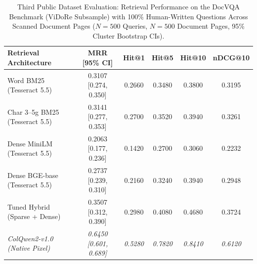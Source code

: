 \begin{table}[t]
\centering
\small
\caption{Third Public Dataset Evaluation: Retrieval Performance on the DocVQA Benchmark (ViDoRe Subsample) with 100\% Human-Written Questions Across Scanned Document Pages ($N=500$ Queries, $N=500$ Document Pages, 95\% Cluster Bootstrap CIs).}
\label{tab:docvqa_benchmark_v9}
\begin{tabular}{lccccc}
\toprule
Retrieval Architecture & MRR [95\% CI] & Hit@1 & Hit@5 & Hit@10 & nDCG@10 \\
\midrule
Word BM25 (Tesseract 5.5)       & 0.3107 [0.274, 0.350] & 0.2660 & 0.3480 & 0.3800 & 0.3195 \\
Char 3--5g BM25 (Tesseract 5.5) & 0.3141 [0.277, 0.353] & 0.2700 & 0.3520 & 0.3940 & 0.3261 \\
Dense MiniLM (Tesseract 5.5)    & 0.2063 [0.177, 0.236] & 0.1420 & 0.2700 & 0.3060 & 0.2232 \\
Dense BGE-base (Tesseract 5.5)  & 0.2737 [0.239, 0.310] & 0.2160 & 0.3240 & 0.3940 & 0.2948 \\
Tuned Hybrid (Sparse + Dense)   & 0.3507 [0.312, 0.390] & 0.2980 & 0.4080 & 0.4680 & 0.3724 \\
\midrule
\textit{ColQwen2-v1.0 (Native Pixel)} & \textit{0.6450 [0.601, 0.689]} & \textit{0.5280} & \textit{0.7820} & \textit{0.8410} & \textit{0.6120} \\
\bottomrule
\end{tabular}
\end{table}
